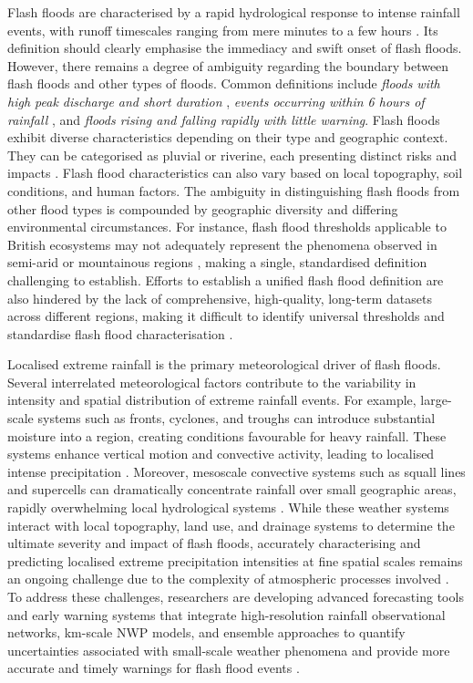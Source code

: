 Flash  floods are characterised by a rapid hydrological response to intense rainfall events, with runoff timescales ranging from mere minutes to a few hours \citep{Davis2001}. Its definition should clearly emphasise the immediacy and swift onset of flash floods. However, there remains a degree of ambiguity regarding the boundary between flash floods and other types of floods. Common definitions include \textit{floods with high peak discharge and short duration} \citep{Zain2021}, \textit{events occurring within 6 hours of rainfall} \citep{Kobiyama2007}, and \textit{floods rising and falling rapidly with little warning}. Flash floods exhibit diverse characteristics depending on their type and geographic context. They can be categorised as pluvial or riverine, each presenting distinct risks and impacts \citep{Archer2018}. Flash flood characteristics can also vary based on local topography, soil conditions, and human factors. The ambiguity in distinguishing flash floods from other flood types is compounded by geographic diversity and differing environmental circumstances. For instance, flash flood thresholds applicable to British ecosystems may not adequately represent the phenomena observed in semi-arid or mountainous regions \citep{Archer2019}, making a single, standardised definition challenging to establish. Efforts to establish a unified flash flood definition are also hindered by the lack of comprehensive, high-quality, long-term datasets across different regions, making it difficult to identify universal thresholds and standardise flash flood characterisation \citep{Kaiser2020, Gourley2013}.

Localised  extreme rainfall is the primary meteorological driver of flash floods. Several interrelated meteorological factors contribute to the variability in intensity and spatial distribution of extreme rainfall events. For example, large-scale systems such as fronts, cyclones, and troughs can introduce substantial moisture into a region, creating conditions favourable for heavy rainfall. These systems enhance vertical motion and convective activity, leading to localised intense precipitation \citep{Zanchetta2020}. Moreover, mesoscale convective systems such as squall lines and supercells can dramatically concentrate rainfall over small geographic areas, rapidly overwhelming local hydrological systems \citep{Maddox1979}. While these weather systems interact with local topography, land use, and drainage systems to determine the ultimate severity and impact of flash floods, accurately characterising and predicting localised extreme precipitation intensities at fine spatial scales remains an ongoing challenge due to the complexity of atmospheric processes involved \citep{Maqtan2022}. To address these challenges, researchers are developing advanced forecasting tools and early warning systems that integrate high-resolution rainfall observational networks, km-scale NWP models, and ensemble approaches to quantify uncertainties associated with small-scale weather phenomena and provide more accurate and timely warnings for flash flood events \citep{Msigwa2024, AlRawas2024}.

